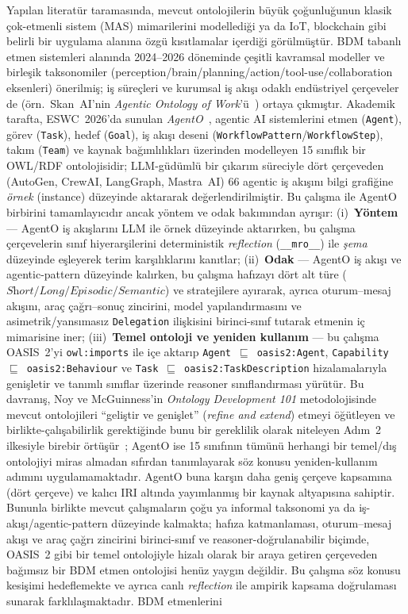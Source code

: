 \documentclass[10pt, a4paper, twocolumn]{article}
\begin{document}
Yapılan literatür taramasında, mevcut ontolojilerin büyük çoğunluğunun klasik çok-etmenli sistem (MAS) mimarilerini modellediği ya da IoT, blockchain gibi belirli bir uygulama alanına özgü kısıtlamalar içerdiği görülmüştür. BDM tabanlı etmen sistemleri alanında 2024--2026 döneminde çeşitli kavramsal modeller ve birleşik taksonomiler (perception/brain/planning/action/tool-use/collaboration eksenleri) önerilmiş; iş süreçleri ve kurumsal iş akışı odaklı endüstriyel çerçeveler de (örn.\ Skan~AI'nin \textit{Agentic Ontology of Work}'ü~\cite{skan2026aow}) ortaya çıkmıştır. Akademik tarafta, ESWC~2026'da sunulan \textit{AgentO}~\cite{agento}, agentic AI sistemlerini etmen (\texttt{Agent}), görev (\texttt{Task}), hedef (\texttt{Goal}), iş akışı deseni (\texttt{WorkflowPattern}/\texttt{WorkflowStep}), takım (\texttt{Team}) ve kaynak bağımlılıkları üzerinden modelleyen 15 sınıflık bir OWL/RDF ontolojisidir; LLM-güdümlü bir çıkarım süreciyle dört çerçeveden (AutoGen, CrewAI, LangGraph, Mastra~AI) 66 agentic iş akışını bilgi grafiğine \emph{örnek} (instance) düzeyinde aktararak değerlendirilmiştir. Bu çalışma ile AgentO birbirini tamamlayıcıdır ancak yöntem ve odak bakımından ayrışır: (i)~\textbf{Yöntem} --- AgentO iş akışlarını LLM ile örnek düzeyinde aktarırken, bu çalışma çerçevelerin sınıf hiyerarşilerini deterministik \emph{reflection} (\texttt{\_\_mro\_\_}) ile \emph{şema} düzeyinde eşleyerek terim karşılıklarını kanıtlar; (ii)~\textbf{Odak} --- AgentO iş akışı ve agentic-pattern düzeyinde kalırken, bu çalışma hafızayı dört alt türe ($\textit{Short}/\textit{Long}/\textit{Episodic}/\textit{Semantic}$) ve stratejilere ayırarak, ayrıca oturum--mesaj akışını, araç çağrı--sonuç zincirini, model yapılandırmasını ve asimetrik/yansımasız \texttt{Delegation} ilişkisini birinci-sınıf tutarak etmenin iç mimarisine iner; (iii)~\textbf{Temel ontoloji ve yeniden kullanım} --- bu çalışma OASIS~2'yi \texttt{owl:imports} ile içe aktarıp \texttt{Agent}~$\sqsubseteq$~\texttt{oasis2:Agent}, \texttt{Capability}~$\sqsubseteq$~\texttt{oasis2:Behaviour} ve \texttt{Task}~$\sqsubseteq$~\texttt{oasis2:TaskDescription} hizalamalarıyla genişletir ve tanımlı sınıflar üzerinde reasoner sınıflandırması yürütür. Bu davranış, Noy ve McGuinness'in \textit{Ontology Development 101} metodolojisinde mevcut ontolojileri ``geliştir ve genişlet'' (\textit{refine and extend}) etmeyi öğütleyen ve birlikte-çalışabilirlik gerektiğinde bunu bir gereklilik olarak niteleyen Adım~2 ilkesiyle birebir örtüşür~\cite{noy2001ontology101}; AgentO ise 15 sınıfının tümünü herhangi bir temel/dış ontolojiyi miras almadan sıfırdan tanımlayarak söz konusu yeniden-kullanım adımını uygulamamaktadır. AgentO buna karşın daha geniş çerçeve kapsamına (dört çerçeve) ve kalıcı IRI altında yayımlanmış bir kaynak altyapısına sahiptir. Bununla birlikte mevcut çalışmaların çoğu ya informal taksonomi ya da iş-akışı/agentic-pattern düzeyinde kalmakta; hafıza katmanlaması, oturum--mesaj akışı ve araç çağrı zincirini birinci-sınıf ve reasoner-doğrulanabilir biçimde, OASIS~2 gibi bir temel ontolojiyle hizalı olarak bir araya getiren çerçeveden bağımsız bir BDM etmen ontolojisi henüz yaygın değildir. Bu çalışma söz konusu kesişimi hedeflemekte ve ayrıca canlı \emph{reflection} ile ampirik kapsama doğrulaması sunarak farklılaşmaktadır. BDM etmenlerini 
\end{document}
